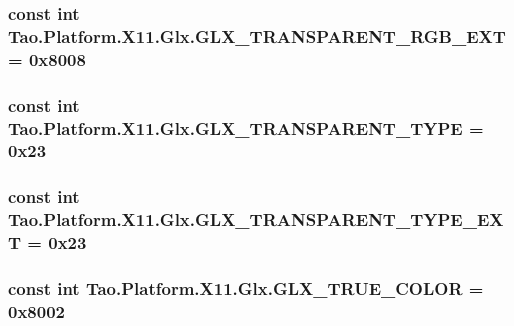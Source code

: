 \label{class_tao_1_1_platform_1_1_x11_1_1_glx_a327c03a517966cea8af701bc311ddc85}
\hypertarget{class_tao_1_1_platform_1_1_x11_1_1_glx_a5afa705a44c8f37c53f84ae1ca0fdd2b}{
\subsubsection[{GLX\_\-TRANSPARENT\_\-RGB\_\-EXT}]{\setlength{\rightskip}{0pt plus 5cm}const int {\bf Tao.Platform.X11.Glx.GLX\_\-TRANSPARENT\_\-RGB\_\-EXT} = 0x8008}}
\label{class_tao_1_1_platform_1_1_x11_1_1_glx_a5afa705a44c8f37c53f84ae1ca0fdd2b}
\hypertarget{class_tao_1_1_platform_1_1_x11_1_1_glx_a63935700d84aed4d00078363b042ba6d}{
\subsubsection[{GLX\_\-TRANSPARENT\_\-TYPE}]{\setlength{\rightskip}{0pt plus 5cm}const int {\bf Tao.Platform.X11.Glx.GLX\_\-TRANSPARENT\_\-TYPE} = 0x23}}
\label{class_tao_1_1_platform_1_1_x11_1_1_glx_a63935700d84aed4d00078363b042ba6d}
\hypertarget{class_tao_1_1_platform_1_1_x11_1_1_glx_a593a81b432a1d5ec6e300ad2f57438e3}{
\subsubsection[{GLX\_\-TRANSPARENT\_\-TYPE\_\-EXT}]{\setlength{\rightskip}{0pt plus 5cm}const int {\bf Tao.Platform.X11.Glx.GLX\_\-TRANSPARENT\_\-TYPE\_\-EXT} = 0x23}}
\label{class_tao_1_1_platform_1_1_x11_1_1_glx_a593a81b432a1d5ec6e300ad2f57438e3}
\hypertarget{class_tao_1_1_platform_1_1_x11_1_1_glx_a4df6c260ab08a6d229d3d407e2ba1dc2}{
\subsubsection[{GLX\_\-TRUE\_\-COLOR}]{\setlength{\rightskip}{0pt plus 5cm}const int {\bf Tao.Platform.X11.Glx.GLX\_\-TRUE\_\-COLOR} = 0x8002}}
